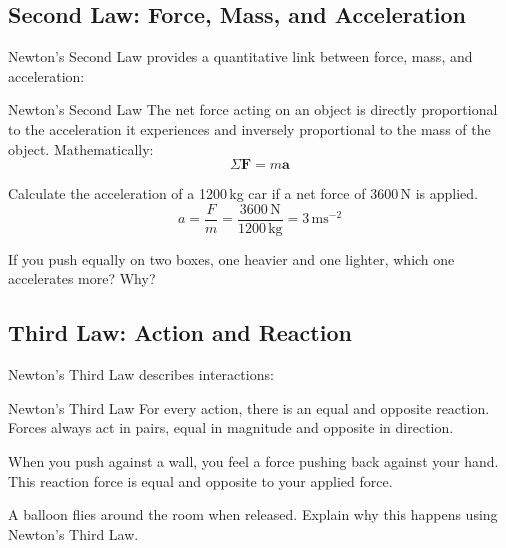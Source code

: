 \subsection{Second Law: Force, Mass, and Acceleration}
\FloatBarrier

Newton’s Second Law provides a quantitative link between force, mass, and acceleration:

\begin{keyconcept}{Newton's Second Law}
The net force acting on an object is directly proportional to the acceleration it experiences and inversely proportional to the mass of the object. Mathematically:
\[
\Sigma \mathbf{F} = m\mathbf{a}
\]
\end{keyconcept}


\begin{example}
Calculate the acceleration of a 1200\,kg car if a net force of 3600\,N is applied.
\[
a = \frac{F}{m} = \frac{3600\,\text{N}}{1200\,\text{kg}} = 3\,\text{ms}^{-2}
\]
\end{example}

\begin{stopandthink}
If you push equally on two boxes, one heavier and one lighter, which one accelerates more? Why?
\end{stopandthink}

\subsection{Third Law: Action and Reaction}
\FloatBarrier

Newton’s Third Law describes interactions:

\begin{keyconcept}{Newton's Third Law}
For every action, there is an equal and opposite reaction. Forces always act in pairs, equal in magnitude and opposite in direction.
\end{keyconcept}

\begin{example}
When you push against a wall, you feel a force pushing back against your hand. This reaction force is equal and opposite to your applied force.
\end{example}

\begin{stopandthink}
A balloon flies around the room when released. Explain why this happens using Newton's Third Law.
\end{stopandthink}

